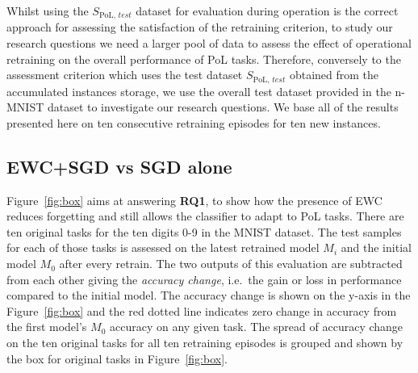 %
%
Whilst using the $S_{\text{PoL, }test}$ dataset for evaluation during operation is the correct approach for assessing the satisfaction of the retraining criterion, to study our research questions we need a larger pool of data to assess the effect of operational retraining on the overall performance of PoL tasks.
%
%
Therefore, conversely to the assessment criterion which uses the test dataset $S_{\text{PoL, }test}$ obtained from the accumulated instances storage, we use the overall test dataset provided in the n-MNIST dataset to investigate our research questions.
%
%
%
We base all of the results presented here on ten consecutive retraining episodes for ten new instances.

\subsection{EWC+SGD vs SGD alone}
Figure~\ref{fig:box} aims at answering \textbf{RQ1}, to show how the presence of EWC reduces forgetting and still allows the classifier to adapt to PoL tasks.
%
There are ten original tasks for the ten digits 0-9 in the MNIST dataset. 
%
The test samples for each of those tasks is assessed on the latest retrained model $M_i$ and the initial model $M_0$ after every retrain. 
%
The two outputs of this evaluation are subtracted from each other giving the \textit{accuracy change}, i.e.\ the gain or loss in performance compared to the initial model. 
%
The accuracy change is shown on the y-axis in the Figure~\ref{fig:box} and the red dotted line indicates zero change in accuracy from the first model's $M_0$ accuracy on any given task. 
% 
The spread of accuracy change on the ten original tasks for all ten retraining episodes is grouped and shown by the box for original tasks in Figure~\ref{fig:box}.

